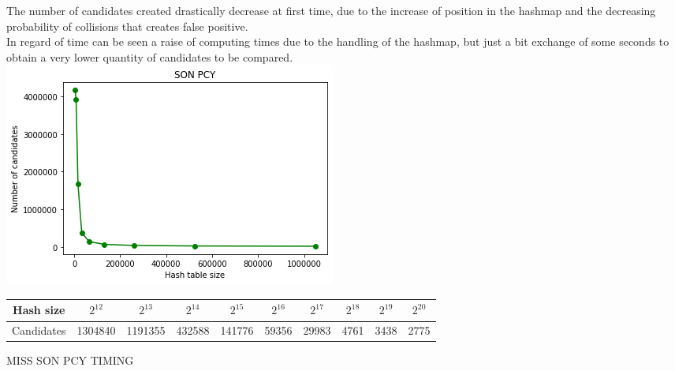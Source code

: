 \documentclass[14pt]{extarticle}
\begin{document}
The number of candidates created drastically decrease at first time, due to the increase of position in the hashmap and the decreasing probability of collisions that creates false positive.\\
In regard of time can be seen a raise of computing times due to the handling of the hashmap, but just a bit exchange of some seconds to obtain a very lower quantity of candidates to be compared.\\
\includegraphics[scale=1]{sonpcy_candidates.png}\\
\begin{center}
\hspace*{-1,5cm}
\begin{tabular}{ |c||c|c|c|c|c|c|c|c|c| } 
 \hline
 Hash size & $2^{12}$ & $2^{13}$ & $2^{14}$ & $2^{15}$ & $2^{16}$ & $2^{17}$ & $2^{18}$ & $2^{19}$ & $2^{20}$ \\
 \hline
 Candidates & 1304840 & 1191355 & 432588 & 141776 & 59356 & 29983 &  4761 & 3438 & 2775 \\
 \hline
\end{tabular}
\end{center}
MISS SON PCY TIMING\\
\end{document}
